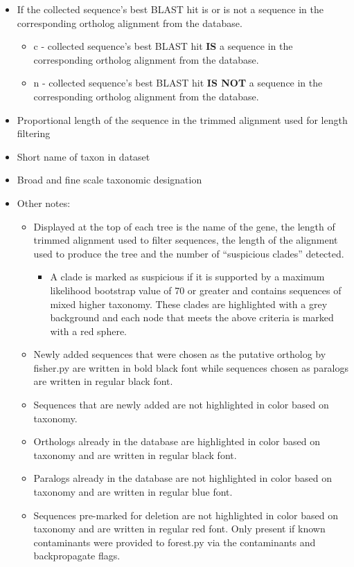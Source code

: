 \documentclass{article}
\begin{document}
\begin{enumerate}[itemsep=12pt]
\begin{itemize}
       \item If the collected sequence’s best BLAST hit is or is not a sequence in the corresponding ortholog alignment from the database.
       \begin{itemize}
           \item c - collected sequence’s best BLAST hit \textbf{IS} a sequence in the corresponding ortholog alignment from the database.
           \item n - collected sequence’s best BLAST hit \textbf{IS NOT} a sequence in the corresponding ortholog alignment from the database.
       \end{itemize}
       \item Proportional length of the sequence in the trimmed alignment used for length filtering
       \item Short name of taxon in dataset
       \item Broad and fine scale taxonomic designation
       \item Other notes:
       \begin{itemize}
           \item Displayed at the top of each tree is the name of the gene, the length of trimmed alignment used to filter sequences, the length of the alignment used to produce the tree and the number of “suspicious clades” detected.
           \begin{itemize}
               \item A clade is marked as suspicious if it is supported by a maximum likelihood bootstrap value of 70 or greater and contains sequences of mixed higher taxonomy. These clades are highlighted with a grey background and each node that meets the above criteria is marked with a red sphere.
           \end{itemize}
           \item Newly added sequences that were chosen as the putative ortholog by fisher.py are written in bold black font while sequences chosen as paralogs are written in regular black font.
           \item Sequences that are newly added are not highlighted in color based on taxonomy.
           \item Orthologs already in the database are highlighted in color based on taxonomy and are written in regular black font.
           \item Paralogs already in the database are not highlighted in color based on taxonomy and are written in regular blue font.
           \item Sequences pre-marked for deletion are not highlighted in color based on taxonomy and are written in regular red font. Only present if known contaminants were provided to forest.py via the contaminants and backpropagate flags.
       \end{itemize}
    \end{itemize}
    

\end{enumerate}
\end{document}
